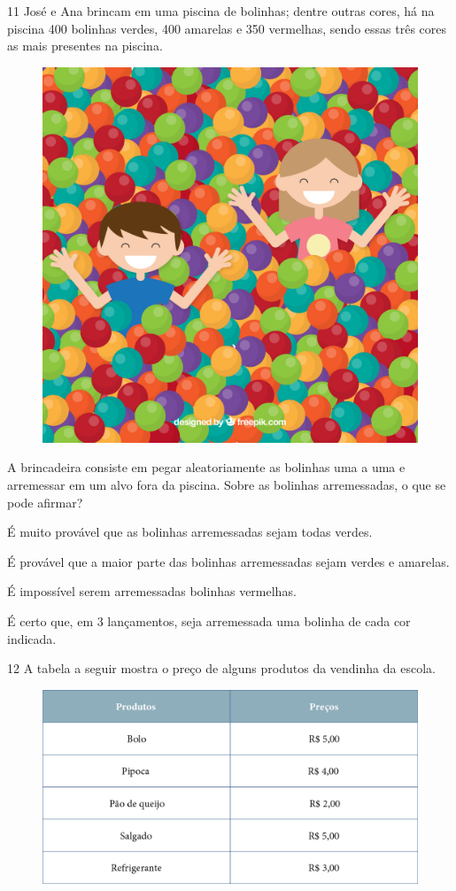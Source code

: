 \num{11} José e Ana brincam em uma piscina de bolinhas; dentre outras cores, há
na piscina 400 bolinhas verdes, 400 amarelas e 350 vermelhas, sendo
essas três cores as mais presentes na piscina.

\begin{figure}[H]
\centering
\includegraphics[width=.7\textwidth]{./media/image147.png}
\end{figure}

A brincadeira consiste em pegar aleatoriamente as bolinhas uma a uma e
arremessar em um alvo fora da piscina. Sobre as bolinhas arremessadas, o que se pode afirmar?

\begin{escolha}[itemsep=-5pt]
\item É muito provável que as bolinhas arremessadas sejam todas verdes.

\item É provável que a maior parte das bolinhas arremessadas sejam verdes e amarelas.

\item É impossível serem arremessadas bolinhas vermelhas.

\item É certo que, em 3 lançamentos, seja arremessada uma bolinha de cada cor indicada.
\end{escolha}

\num{12} A tabela a seguir mostra o preço de alguns produtos da vendinha da escola.

\begin{figure}[H]
\includegraphics[width=\textwidth]{./media/image148.png}
\end{figure}

